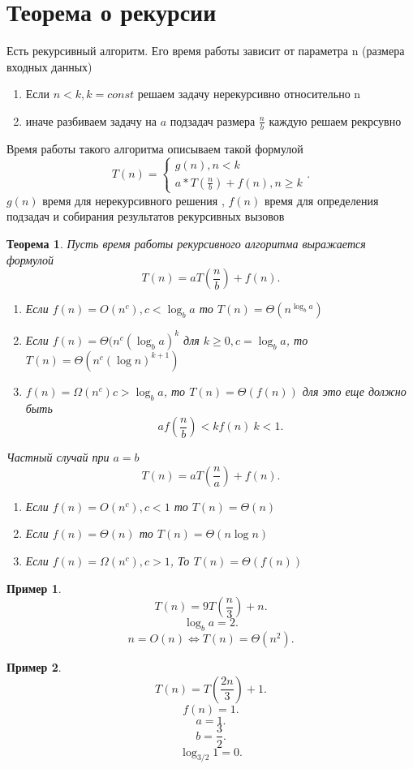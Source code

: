 \documentclass[14pt]{extarticle}
\newtheorem{theorem}{Теорема}
\newtheorem{exmp}{Пример}[theorem]
\begin{document}
    \section{Теорема о рекурсии}
    Есть рекурсивный алгоритм. Его время работы зависит от параметра n (размера входных данных)
    \begin{enumerate}
        \item Если $n < k, k = const$ решаем задачу нерекурсивно относительно n
        \item иначе разбиваем задачу на  $a$ подзадач размера  $\frac{n}{b}$ каждую решаем рекрсувно
    \end{enumerate}
    Время работы такого алгоритма описываем такой формулой
    \[
    T(n) = 
    \begin{cases}
        g(n), n < k\\
        a * T(\frac{n}{b}) + f(n), n\ge  k
    \end{cases}
    .\] 
    $g(n)$ время для нерекурсивного решения ,  $f(n)$ время для определения подзадач и собирания результатов рекурсивных вызовов
     \begin{theorem}
        Пусть время работы рекурсивного алгоритма выражается формулой
        \[
        T(n) = aT(\frac{n}{b}) + f(n)
        .\] 
        \begin{enumerate}
            \item Если $f(n) = O(n^{c}), c< \log_{b}{a}$ то $T(n) = \Theta(n^{\log_{b}a})$
            \item Если $f(n) = \Theta(n^{c} (\log_{b}a)^{k}$ для $k\ge 0, c= \log_{b}a$, то $T(n) =\Theta(n^{c} (\log{n})^{k+1})$
             \item $f(n) = \Omega(n^{c}) c > \log_{b}a$, то $T(n) = \Theta(f(n))$ 
                 для это еще должно быть
                 \[
                 a f(\frac{n}{b}) < k f(n) ~ k < 1
                 .\] 
        \end{enumerate}
        Частный случай при $a = b$
         \[
        T(n) = a T(\frac{n}{a}) + f(n)
        .\] 
        \begin{enumerate}
            \item Если $f(n) = O(n^{c}) ,c<1$ то $T(n) = \Theta(n)$
            \item Если  $f(n) =  \Theta(n)$ то  $T(n) = \Theta(n \log{n})$
            \item Если $f(n) = \Omega(n^{c}), c> 1$, То $T(n) = \Theta(f(n))$
        \end{enumerate}
    \end{theorem}
    \begin{exmp}
        \[
        T(n) = 9T(\frac{n}{3}) + n
        .\] 
        \[
            \log_{b}{a} = 2
        .\] 
        \[
        n = O(n) \iff T(n) = \Theta(n^{2})
        .\] 
    \end{exmp}
    \begin{exmp}
        \[
        T(n)=T (\frac{2 n}{3}) +1
        .\] 
        \[
        f(n) = 1
        .\] 
        \[
        a = 1
        .\] 
        \[
        b = \frac{3}{2}
        .\] 
        \[
            \log_{3/2} 1 = 0
        .\] 
    \end{exmp}
\end{document}
